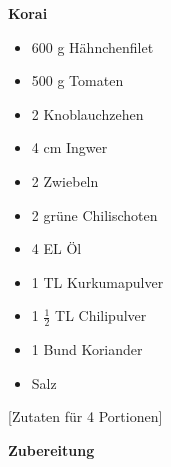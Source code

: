 

\parindent0pt	

\pagestyle{empty}


\textbf{{\LARGE Korai}}%

\hrulefill
\vspace*{\fill}
\begin{multicols}{2}	


\begin{itemize}
\item 600 g Hähnchenfilet
\item 500 g Tomaten
\item 2 Knoblauchzehen
\item 4 cm Ingwer
\item 2 Zwiebeln
\item 2 grüne Chilischoten
\item 4 EL Öl
\item 1 TL Kurkumapulver
\item 1 $\frac{1}{2}$ TL Chilipulver
\item 1 Bund Koriander
\item Salz
\end{itemize}
\end{multicols}

\vspace{2cm}			%
\begin{center}			%
[Zutaten für 4 Portionen]%
\end{center}


\vfill
\newpage
\textbf{{\LARGE Zubereitung}}%

\hrulefill

